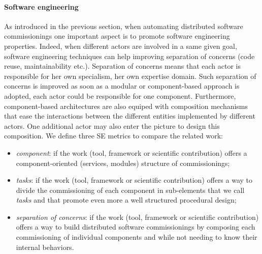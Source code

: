 \paragraph{Software engineering}
As introduced in the previous section, when automating distributed
software commissionings one important aspect is to promote software
engineering properties. Indeed, when different actors are involved in
a same given goal, software engineering techniques can help improving
separation of concerns (\ie code reuse, maintainability
etc.). Separation of concerns means that each actor is responsible for
her own specialism, \ie her own expertise domain. Such separation of
concerns is improved as soon as a modular or component-based approach
is adopted, \ie each actor could be responsible for one
component. Furthermore, component-based architectures are also equiped
with composition mechanisms that ease the interactions between the
different entities implemented by different actors. One additional
actor may also enter the picture to design this composition. We define
three SE metrics to compare the related work:
\begin{itemize}
\item \emph{component}: if the work (tool, framework or scientific
  contribution) offers a component-oriented (\eg services, modules)
  structure of commissionings;
\item \emph{tasks}: if the work (tool, framework or scientific
  contribution) offers a way to divide the commissioning of each
  component in sub-elements that we call \emph{tasks} and that promote
  even more a well structured procedural design;
\item \emph{separation of concerns}: if the work (tool, framework or
  scientific contribution) offers a way to build distributed software
  commissionings by composing each commissioning of individual
  components and while not needing to know their internal behaviors.
\end{itemize}

